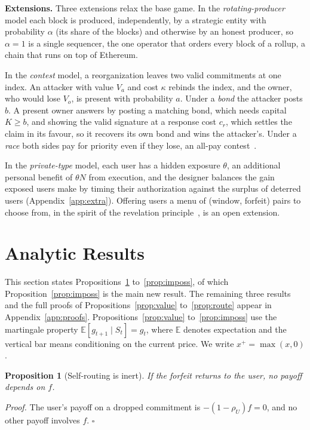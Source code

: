 \documentclass[11pt]{article}
\newtheorem{proposition}{Proposition}
\newcommand{\E}{\mathbb{E}}
\begin{document}
\textbf{Extensions.} Three extensions relax the base game. In the \emph{rotating-producer} model each block is produced, independently, by a strategic entity with probability $\alpha$ (its share of the blocks) and otherwise by an honest producer, so $\alpha=1$ is a single sequencer, the one operator that orders every block of a rollup, a chain that runs on top of Ethereum.

In the \emph{contest} model, a reorganization leaves two valid commitments at one index. An attacker with value $V_a$ and cost $\kappa$ rebinds the index, and the owner, who would lose $V_o$, is present with probability $a$. Under a \emph{bond} the attacker posts $b$. A present owner answers by posting a matching bond, which needs capital $K\ge b$, and showing the valid signature at a response cost $c_r$, which settles the claim in its favour, so it recovers its own bond and wins the attacker's. Under a \emph{race} both sides pay for priority even if they lose, an all-pay contest~\cite{baye1996allpay}.

In the \emph{private-type} model, each user has a hidden exposure $\theta$, an additional personal benefit of $\theta N$ from execution, and the designer balances the gain exposed users make by timing their authorization against the surplus of deterred users (Appendix~\ref{app:extra}). Offering users a menu of (window, forfeit) pairs to choose from, in the spirit of the revelation principle~\cite{myerson1979incentive}, is an open extension.

\section{Analytic Results}\label{sec:theory}
This section states Propositions~\ref{prop:self} to~\ref{prop:imposs}, of which Proposition~\ref{prop:imposs} is the main new result. The remaining three results and the full proofs of Propositions~\ref{prop:value} to~\ref{prop:route} appear in Appendix~\ref{app:proofs}. Propositions~\ref{prop:value} to~\ref{prop:imposs} use the martingale property $\E[g_{t+1}\mid S_t]=g_t$, where $\E$ denotes expectation and the vertical bar means conditioning on the current price. We write $x^+=\max(x,0)$.

\begin{proposition}[Self-routing is inert]\label{prop:self}
If the forfeit returns to the user, no payoff depends on $f$.
\end{proposition}
\emph{Proof.} The user's payoff on a dropped commitment is $-(1-\rho_U)f=0$, and no other payoff involves $f$. \hfill$\square$
\end{document}
